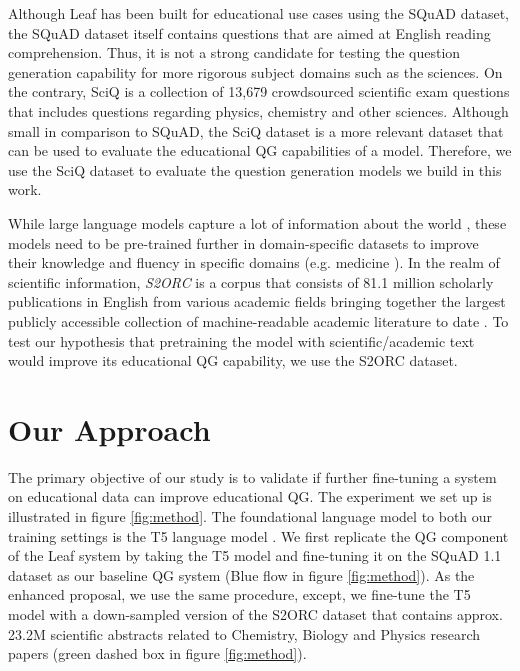 \documentclass[letterpaper]{article} %
\begin{document}
Although Leaf has been built for educational use cases using the SQuAD dataset, the SQuAD dataset itself contains questions that are aimed at English reading comprehension. Thus, it is not a strong candidate for testing the question generation capability for more rigorous subject domains such as the sciences. 
On the contrary, SciQ \cite{welbl-etal-2017-crowdsourcing} is a collection of 13,679 crowdsourced scientific exam questions that includes questions regarding physics, chemistry and other sciences. Although small in comparison to SQuAD, the SciQ dataset is a more relevant dataset that can be used to evaluate the educational QG capabilities of a model. Therefore, we use the SciQ dataset to evaluate the question generation models we build in this work. 

While large language models capture a lot of information about the world \cite{raffel2020exploring}, these models need to be pre-trained further in domain-specific datasets to improve their knowledge and fluency in specific domains (e.g. medicine \cite{https://doi.org/10.48550/arxiv.2109.04588}). In the realm of scientific information, \emph{S2ORC} is a corpus that consists of 81.1 million scholarly publications in English from various academic fields bringing together the largest publicly accessible collection of machine-readable academic literature to date \cite{lo-etal-2020-s2orc}. To test our hypothesis that pretraining the model with scientific/academic text would improve its educational QG capability, we use the S2ORC dataset.

\section{Our Approach}

The primary objective of our study is to validate if further fine-tuning a system on educational data can improve educational QG. The experiment we set up is illustrated in figure \ref{fig:method}. The foundational language model to both our training settings is the T5 language model \cite{raffel2020exploring}. We first replicate the QG component of the Leaf system \cite{vachev2022leaf} by taking the T5 model and fine-tuning it on the SQuAD 1.1 dataset as our baseline QG system (Blue flow in figure \ref{fig:method}). As the enhanced proposal, we use the same procedure, except, we fine-tune the T5 model with a down-sampled version of the S2ORC dataset  that contains approx. {23.2M} scientific abstracts related to Chemistry, Biology and Physics research papers (green dashed box in figure \ref{fig:method}). 
\end{document}
